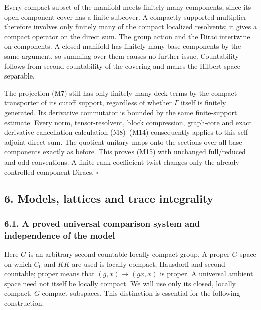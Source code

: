 \documentclass[
  11pt,
]{article}
\begin{document}
Every compact subset of the manifold meets finitely many components,
since its open component cover has a finite subcover. A compactly
supported multiplier therefore involves only finitely many of the
compact localized resolvents; it gives a compact operator on the direct
sum. The group action and the Dirac intertwine on components. A closed
manifold has finitely many base components by the same argument, so
summing over them causes no further issue. Countability follows from
second countability of the covering and makes the Hilbert space
separable.

The projection (M7) still has only finitely many deck terms by the
compact transporter of its cutoff support, regardless of whether
\(\Gamma\) itself is finitely generated. Its derivative commutator is
bounded by the same finite-support estimate. Every norm,
tensor-resolvent, block compression, graph-core and exact
derivative-cancellation calculation (M8)--(M14) consequently applies to
this self-adjoint direct sum. The quotient unitary maps onto the
sections over all base components exactly as before. This proves (M15)
with unchanged full/reduced and odd conventions. A finite-rank
coefficient twist changes only the already controlled component Diracs.
\(\square\)

\subsection{6. Models, lattices and trace
integrality}\label{models-lattices-and-trace-integrality}

\subsubsection{6.1. A proved universal comparison system and
independence of the
model}\label{a-proved-universal-comparison-system-and-independence-of-the-model}

Here \(G\) is an arbitrary second-countable locally compact group. A
proper \(G\)-space on which \(C_0\) and \(KK\) are used is locally
compact, Hausdorff and second countable; proper means that
\((g,x)\mapsto(gx,x)\) is proper. A universal ambient space need not
itself be locally compact. We will use only its closed, locally compact,
\(G\)-compact subspaces. This distinction is essential for the following
construction.
\end{document}

